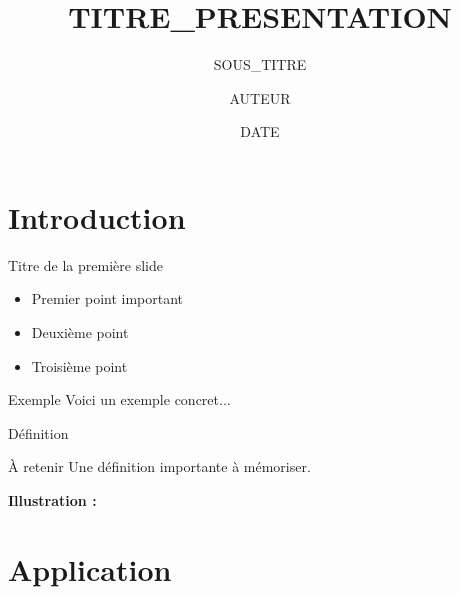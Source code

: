 \documentclass[14pt, xcolor={svgnames}]{beamer}
\title{{{TITRE_PRESENTATION}}}
\subtitle{{{SOUS_TITRE}}}
\author{{{AUTEUR}}}
\date{{{DATE}}}
\institute{{{ETABLISSEMENT}}}
\begin{document}
\begin{frame}
  \titlepage
\end{frame}


\section{Introduction}

\begin{frame}{Titre de la première slide}
  \begin{itemize}[<+->]  %
    \item Premier point important
    \item Deuxième point
    \item Troisième point
  \end{itemize}

  \pause

  \begin{exampleblock}{Exemple}
    Voici un exemple concret...
  \end{exampleblock}
\end{frame}

\begin{frame}{Définition}
  \begin{block}{À retenir}
    Une définition importante à mémoriser.
  \end{block}

  \pause
  \vspace{1em}

  \textbf{Illustration :}

  \begin{center}
  \end{center}
\end{frame}

\section{Application}
\end{document}
